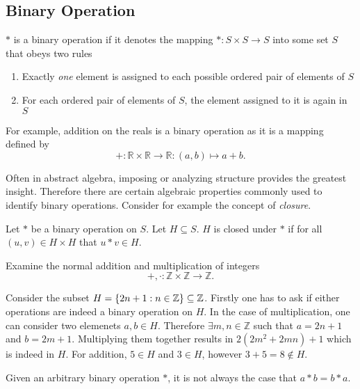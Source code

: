\documentclass[../notes.tex]{subfiles}
\begin{document}

\subsection{Binary Operation}

\begin{definition}
	$*$ is a binary operation if it denotes the mapping $* : S\times S \to S$ into some set $S$ that obeys two rules
	\begin{enumerate}
		\item Exactly \textit{one} element is assigned to each possible ordered pair of elements of $S$
		\item For each ordered pair of elements of $S$, the element assigned to it is again in $S$
	\end{enumerate}
\end{definition}

For example, addition on the reals is a binary operation as it is a mapping defined by
\[
	+ : \mathbb{R}\times \mathbb{R} \to \mathbb{R} : (a,b) \mapsto a + b
.\]

Often in abstract algebra, imposing or analyzing structure provides the greatest insight. Therefore there are certain algebraic properties commonly used to identify binary operations. Consider for example the concept of \textit{closure}.

\begin{definition}[Closure]
	Let $*$ be a binary operation on $S$. Let $H \subseteq S$. $H$ is closed under $*$ if for all $(u,v) \in H \times H$ that $u * v \in H$.
\end{definition}

\begin{example}
Examine the normal addition and multiplication of integers
\[
	+, \boldsymbol{\cdot} : \mathbb{Z} \times \mathbb{Z} \to \mathbb{Z}
.\]

Consider the subset $H  = \qty{2n + 1 : n \in \mathbb{Z}} \subseteq \mathbb{Z}$. Firstly one has to ask if either operations are indeed a binary operation on $H$. In the case of multiplication, one can consider two elemenets $a,b \in H$. Therefore $\exists m,n \in \mathbb{Z}$ such that $a = 2n + 1$ and $b = 2m + 1$. Multiplying them together results in $2(2m^2 + 2mn) + 1$ which is indeed in $H$. For addition, $5 \in H$ and $3 \in H$, however $3 + 5 = 8 \notin H$.
\end{example}

\begin{remark}
	Given an arbitrary binary operation $*$, it is not always the case that $a * b = b * a$.
\end{remark}
\end{document}
